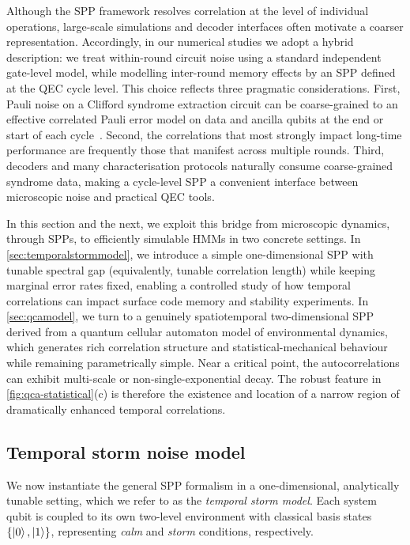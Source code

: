 Although the SPP framework resolves correlation at the level of individual operations, large-scale simulations and decoder interfaces often motivate a coarser representation. Accordingly, in our numerical studies we adopt a hybrid description: we treat within-round circuit noise using a standard independent gate-level model, while modelling inter-round memory effects by an SPP defined at the QEC cycle level. This choice reflects three pragmatic considerations. First, Pauli noise on a Clifford syndrome extraction circuit can be coarse-grained to an effective correlated Pauli error model on data and ancilla qubits at the end or start of each cycle~\cite{gicevQuantumComputerError2024}. Second, the correlations that most strongly impact long-time performance are frequently those that manifest across multiple rounds. Third, decoders and many characterisation protocols naturally consume coarse-grained syndrome data, making a cycle-level SPP a convenient interface between microscopic noise and practical QEC tools.

In this section and the next, we exploit this bridge from microscopic dynamics, through SPPs, to efficiently simulable HMMs in two concrete settings. In \cref{sec:temporalstormmodel}, we introduce a simple one-dimensional SPP with tunable spectral gap (equivalently, tunable correlation length) while keeping marginal error rates fixed, enabling a controlled study of how temporal correlations can impact surface code memory and stability experiments. In \cref{sec:qcamodel}, we turn to a genuinely spatiotemporal two-dimensional SPP derived from a quantum cellular automaton model of environmental dynamics, which generates rich correlation structure and statistical-mechanical behaviour while remaining parametrically simple. Near a critical point, the autocorrelations can exhibit multi-scale or non-single-exponential decay. The robust feature in \cref{fig:qca-statistical}(c) is therefore the existence and location of a narrow region of dramatically enhanced temporal correlations.

\subsection{Temporal storm noise model}\label{sec:storm-model-details}
We now instantiate the general SPP formalism in a one-dimensional, analytically tunable setting, which we refer to as the \emph{temporal storm model}. Each system qubit is coupled to its own two-level environment with classical basis states \(\{\ket{0},\ket{1}\}\), representing \emph{calm} and \emph{storm} conditions, respectively.

